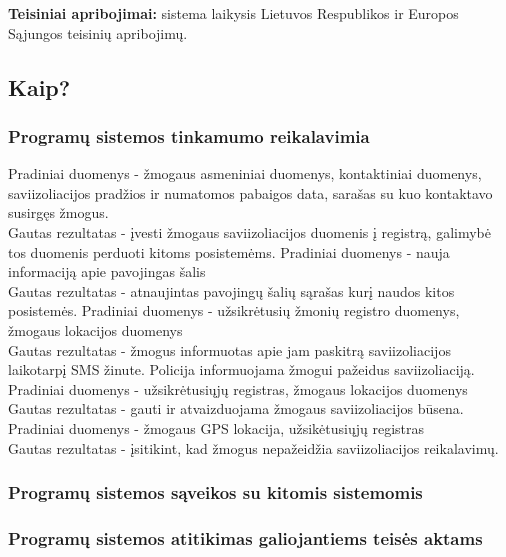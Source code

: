 \documentclass{VUMIFPSkursinis}
\begin{document}
\textbf{Teisiniai apribojimai:} sistema laikysis Lietuvos Respublikos ir Europos Sąjungos teisinių apribojimų.

\subsection{Kaip?}\label{sec:PSReqHow}
	\subsubsection{Programų sistemos tinkamumo reikalavimia}
			Pradiniai duomenys - žmogaus asmeniniai duomenys, kontaktiniai duomenys, saviizoliacijos pradžios ir numatomos pabaigos data, sarašas su kuo kontaktavo susirgęs žmogus.
			\\
			Gautas rezultatas - įvesti žmogaus saviizoliacijos duomenis į registrą, galimybė tos duomenis perduoti kitoms posistemėms.
			Pradiniai duomenys - nauja informaciją apie pavojingas šalis
			\\
			Gautas rezultatas - atnaujintas pavojingų šalių sąrašas kurį naudos kitos posistemės.
			Pradiniai duomenys - užsikrėtusių žmonių registro duomenys, žmogaus lokacijos duomenys
			\\
			Gautas rezultatas - žmogus informuotas apie jam paskitrą saviizoliacijos laikotarpį SMS žinute. Policija informuojama žmogui pažeidus saviizoliaciją.
			Pradiniai duomenys - užsikrėtusiųjų registras, žmogaus lokacijos duomenys
			\\
			Gautas rezultatas - gauti ir atvaizduojama žmogaus saviizoliacijos būsena.
			Pradiniai duomenys - žmogaus GPS lokacija, užsikėtusiųjų registras
			\\
			Gautas rezultatas - įsitikint, kad žmogus nepažeidžia saviizoliacijos reikalavimų.
	\subsubsection{Programų sistemos sąveikos su kitomis sistemomis}
	\subsubsection{Programų sistemos atitikimas galiojantiems teisės aktams}
\end{document}
